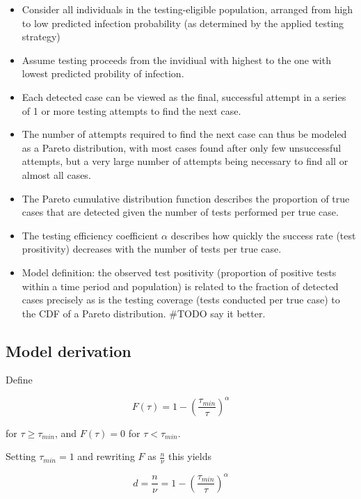 \documentclass[
]{article}
\begin{document}
\begin{itemize}
\item
  Consider all individuals in the testing-eligible population, arranged
  from high to low predicted infection probability (as determined by the
  applied testing strategy)
\item
  Assume testing proceeds from the invidiual with highest to the one
  with lowest predicted probility of infection.
\item
  Each detected case can be viewed as the final, successful attempt in a
  series of 1 or more testing attempts to find the next case.
\item
  The number of attempts required to find the next case can thus be
  modeled as a Pareto distribution, with most cases found after only few
  unsuccessful attempts, but a very large number of attempts being
  necessary to find all or almost all cases.
\item
  The Pareto cumulative distribution function describes the proportion
  of true cases that are detected given the number of tests performed
  per true case.
\item
  The testing efficiency coefficient \(\alpha\) describes how quickly
  the success rate (test prositivity) decreases with the number of tests
  per true case.
\item
  Model definition: the observed test positivity (proportion of positive
  tests within a time period and population) is related to the fraction
  of detected cases precisely as is the testing coverage (tests
  conducted per true case) to the CDF of a Pareto distribution. \#TODO
  say it better.
\end{itemize}

\hypertarget{model-derivation}{%
\subsection{Model derivation}\label{model-derivation}}

Define

\begin{equation}
F(\tau) = 1 - \left(\frac{\tau_{min}}{\tau} \right)^\alpha
\end{equation}

for \(\tau \ge \tau_{min}\), and \(F(\tau) = 0\) for
\(\tau < \tau_{min}\).

Setting \(\tau_{min} = 1\) and rewriting \(F\) as \(\frac{n}{\nu}\) this
yields

\begin{equation}
d = \frac{n}{\nu} = 1 - \left(\frac{\tau_{min}}{\tau}\right)^\alpha
\end{equation}
\end{document}
